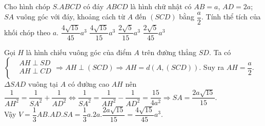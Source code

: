 \begin{ex}%
Cho hình chóp $ S.ABCD$ có đáy $ ABCD$ là hình chữ nhật có $ AB=a$, $ AD=2a$; $ SA$ vuông góc với đáy, khoảng cách từ $ A$ đến $\left(SCD\right)$ bằng $\dfrac{a}{2}$. Tính thể tích của khối chóp theo $ a$.
\choice
{\True $\dfrac{4\sqrt{15}}{45}{a^3}$}
{$\dfrac{4\sqrt{15}}{15}{a^3}$}
{$\dfrac{2\sqrt{5}}{15}{a^3}$}
{$\dfrac{2\sqrt{5}}{45}{a^3}$}
\loigiai
{
\begin{center}
\end{center}
Gọi $ H$ là hình chiếu vuông góc của điểm $ A$ trên đường thẳng $ SD$. Ta có\\
$\left\{\begin{aligned}
& AH\perp SD\\ 
& AH\perp CD\\ 
\end{aligned}\right.$$\Rightarrow AH\perp\left(SCD\right)$$\Rightarrow AH=d\left(A,\left(SCD\right)\right)$. Suy ra $ AH=\dfrac{a}{2}$.\\
$\Delta SAD$ vuông tại $ A$ có đường cao $ AH$ nên\\
$\dfrac{1}{A{H^2}}=\dfrac{1}{S{A^2}}+\dfrac{1}{A{D^2}}$$\Leftrightarrow\dfrac{1}{S{A^2}}=\dfrac{1}{A{H^2}}-\dfrac{1}{A{D^2}}$$=\dfrac{15}{4a^2}$$\Rightarrow SA=\dfrac{2a\sqrt{15}}{15}$.\\
Vậy $ V=\dfrac{1}{3}AB.AD.SA$$=\dfrac{1}{3}a.2a.\dfrac{2a\sqrt{15}}{15}$$=\dfrac{4\sqrt{15}}{45}{a^3}$.}
\end{ex}


